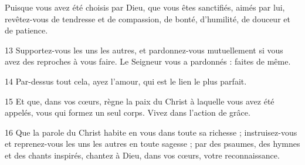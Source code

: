 Puisque vous avez été choisis par Dieu, que vous êtes sanctifiés, aimés par lui, revêtez-vous de tendresse et de compassion, de bonté, d’humilité, de douceur et de patience.

13 Supportez-vous les uns les autres, et pardonnez-vous mutuellement si vous avez des reproches à vous faire. Le Seigneur vous a pardonnés : faites de même.

14 Par-dessus tout cela, ayez l’amour, qui est le lien le plus parfait.

15 Et que, dans vos cœurs, règne la paix du Christ à laquelle vous avez été appelés, vous qui formez un seul corps. Vivez dans l’action de grâce.

16 Que la parole du Christ habite en vous dans toute sa richesse ; instruisez-vous et reprenez-vous les uns les autres en toute sagesse ; par des psaumes, des hymnes et des chants inspirés, chantez à Dieu, dans vos cœurs, votre reconnaissance.